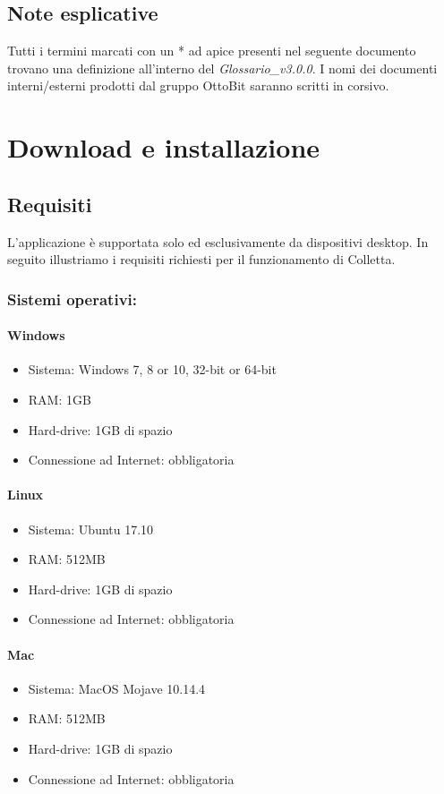 \documentclass[11pt,a4paper]{article}
\begin{document}
{	\subsection{Note esplicative}
	Tutti i termini marcati con un * ad apice presenti nel seguente documento trovano una definizione
	all’interno del \textit{Glossario\_v3.0.0}.
	I nomi dei documenti interni/esterni prodotti dal gruppo OttoBit saranno scritti in corsivo.
	\newpage
	\section{Download e installazione}
	\subsection{Requisiti}
	L'applicazione è supportata solo ed esclusivamente da dispositivi desktop. In seguito illustriamo i requisiti richiesti per il funzionamento di Colletta.
	\subsubsection{Sistemi operativi:} 
	\paragraph{Windows}
	\begin{itemize}
		\item Sistema: Windows 7, 8 or 10, 32-bit or 64-bit
		\item RAM: 1GB
		\item Hard-drive: 1GB di spazio
		\item Connessione ad Internet: obbligatoria
	\end{itemize}
	\paragraph{Linux}
	\begin{itemize}
		\item Sistema: Ubuntu 17.10
		\item RAM: 512MB
		\item Hard-drive: 1GB di spazio
		\item Connessione ad Internet: obbligatoria
	\end{itemize}
	\paragraph{Mac}
	\begin{itemize}
		\item Sistema: MacOS Mojave 10.14.4
		\item RAM: 512MB
		\item Hard-drive: 1GB di spazio
		\item Connessione ad Internet: obbligatoria
	\end{itemize}
}
\end{document}
